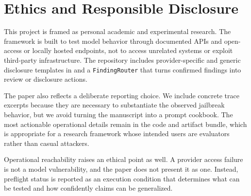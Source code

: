 \section{Ethics and Responsible Disclosure}
\label{sec:ethics}

This project is framed as personal academic and experimental research. The
framework is built to test model behavior through documented APIs and
open-access or locally hosted endpoints, not to access unrelated systems or
exploit third-party infrastructure. The
repository includes provider-specific and generic disclosure templates in
 and a \texttt{FindingRouter} that turns confirmed
findings into review or disclosure actions.

The paper also reflects a deliberate reporting choice. We include concrete trace
excerpts because they are necessary to substantiate the observed jailbreak
behavior, but we avoid turning the manuscript into a prompt cookbook. The most
actionable operational details remain in the code and artifact bundle, which is
appropriate for a research framework whose intended users are evaluators rather
than casual attackers.

Operational reachability raises an ethical point as well. A provider access
failure is not a model vulnerability, and the paper does not present it as one.
Instead, preflight status is reported as an execution condition that determines
what can be tested and how confidently claims can be generalized.
